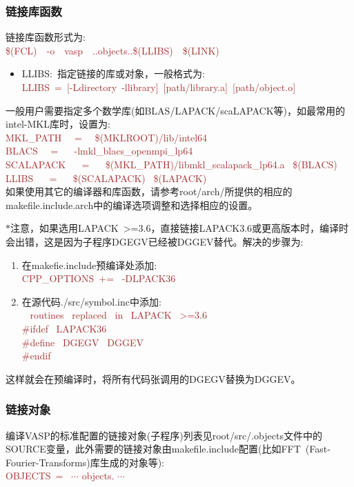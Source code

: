 \subsubsection{\rm{链接库函数}}
链接库函数形式为:\\
\textcolor{brown}{\textrm{\$(FCL)~~-o~~vasp~~..objects..\$(LLIBS)~~\$(LINK)}}
\begin{itemize}
	\item \textrm{LLIBS}:~指定链接的库或对象，一般格式为:\\
		\textcolor{brown}{\textrm{LLIBS~=~[-Ldirectory~-llibrary]~[path/library.a]~[path/object.o]}}
\end{itemize}
一般用户需要指定多个数学库(如\textrm{BLAS/LAPACK/scaLAPACK}等)，如最常用的\textrm{intel-MKL}库时，设置为:\\
\textcolor{brown}{\textrm{
	MKL\_PATH~~ = ~~\$(MKLROOT)/lib/intel64\\
BLACS~~ = ~~ -lmkl\_blacs\_openmpi\_lp64\\
SCALAPACK ~~ = ~~  \$(MKL\_PATH)/libmkl\_scalapack\_lp64.a ~\$(BLACS)\\
LLIBS ~~ = ~~ \$(SCALAPACK) ~\$(LAPACK) }}\\
如果使用其它的编译器和库函数，请参考\textrm{root/arch/}所提供的相应的\textrm{makefile.include.arch}中的编译选项调整和选择相应的设置。

$\ast$注意，如果选用\textrm{LAPACK~>=3.6}，直接链接\textrm{LAPACK3.6}或更高版本时，编译时会出错，这是因为子程序\textrm{DGEGV}已经被\textrm{DGGEV}替代。解决的步骤为:~
\begin{enumerate}
	\item 在\textrm{makefie.include}预编译处添加:\\
		\textcolor{brown}{\textrm{CPP\_OPTIONS~+= ~-DLPACK36}}
	\item 在源代码\textrm{./src/symbol.inc}中添加:\\
		\textcolor{brown}{\textrm{
			\!~ routines ~replaced~ in~ LAPACK~ >=3.6\\
\#ifdef~ LAPACK36\\
\#define~ DGEGV~ DGGEV\\
\#endif}}
\end{enumerate}
这样就会在预编译时，将所有代码张调用的\textrm{DGEGV}替换为\textrm{DGGEV}。

\subsubsection{\rm{链接对象}}
编译\textrm{VASP}的标准配置的链接对象(子程序)列表见\textrm{root/src/.objects}文件中的\textrm{SOURCE}变量，此外需要的链接对象由\textrm{makefile.include}配置(比如\textrm{FFT~(Fast-Fourier-Transforms)}库生成的对象等):\\
\textcolor{brown}{\textrm{OBJECTS~= ~$\cdots$ objects. $\cdots$}}

